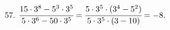 57. $\cfrac{15\cdot3^8-5^3\cdot3^5}{5\cdot3^6-50\cdot3^5}=
\cfrac{5\cdot3^5\cdot(3^4-5^2)}{5\cdot3^5\cdot(3-10)}=-8.$\\
